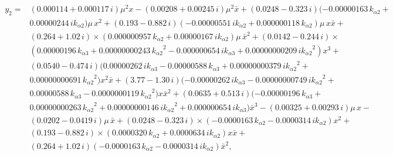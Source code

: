\documentclass[openacc]{rsproca_new}%
\begin{document}
\begin{appendices}
\begin{align}
\begin{split}
  y_2=&(  0.000114+ 0.000117\,i ) {\mu}^{2}x- (  0.00208+
  0.00245\,i ) {\mu}^{2}\bar x+ (  0.0248- 0.323\,i )
  ( - 0.00000163\,{k_{\alpha 2}}+\\
   &0.00000244\,i{k_{\alpha 2}} ) \mu\,{
  x}^{2}+ (  0.193- 0.882\,i )  ( - 0.00000551\,i{
  k_{\alpha 2}}+ 0.000000118\,{k_{\alpha 2}} ) \mu\,x\bar x+\\& (  0.264+ 1.02\,i
  ) \times
  (  0.000000957\,{k_{\alpha 2}}+ 0.00000167\,i{k_{\alpha 2}}
  ) \mu\,{\bar x}^{2}+ (  0.0142- 0.244\,i )\times \\
  & (
  0.00000196\,{k_{\alpha 3}}+ 0.00000000243\,{{k_{\alpha 2}}}^{2}- 0.000000654\,i
  {k_{\alpha 3}}+ 0.00000000209\,i{{k_{\alpha 2}}}^{2} ) {x}^{3}+ \\
  & (
  0.0540- 0.474\,i )  (  0.00000262\,i{k_{\alpha 3}}- 0.00000588
  \,{k_{\alpha 3}}+ 0.00000000379\,i{{k_{\alpha 2}}}^{2}+\\& 0.00000000691\,{{k_{\alpha 2}
  }}^{2} ) {x}^{2}\bar x+ (  3.77- 1.30\,i )  ( -
  0.00000262\,i{k_{\alpha 3}}- 0.00000000749\,i{{k_{\alpha 2}}}^{2}+\\& 0.00000588\,
  {k_{\alpha 3}}- 0.0000000119\,{{k_{\alpha 2}}}^{2} ) x{\bar x}^{2}+ (
  0.0635+ 0.513\,i )  ( - 0.00000196\,{k_{\alpha 3}}+\\&
  0.00000000263\,{{k_{\alpha 2}}}^{2}+
  0.00000000146\,i{{k_{\alpha 2}}}^{2}+
  0.000000654\,i{k_{\alpha 3}} ) {\bar x}^{3}- (  0.00325+ 0.00293\,i
  ) \mu\,x- \\& (  0.0202- 0.0419\,i ) \mu\,\bar x+(
  0.0248- 0.323\,i ) \times
   ( - 0.0000163\,{k_{\alpha 2}}- 0.0000314\,i
  {k_{\alpha 2}} ) {x}^{2}+\\&(  0.193- 0.882\,i ) \times  (
  0.0000320\,{k_{\alpha 2}}+ 0.0000634\,i{k_{\alpha 2}} ) x\bar x+
  \\& (  0.264
  + 1.02\,i )  ( - 0.0000163\,{k_{\alpha 2}}- 0.0000314\,i{k_{\alpha 2}
  } ) {\bar x}^{2},
  \end{split}
  \end{align}


\end{appendices}
\end{document}
